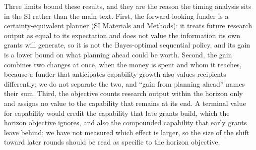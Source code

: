 Three limits bound these results, and they are the reason the timing analysis sits in the SI rather than the main text. First, the forward-looking funder is a certainty-equivalent planner (SI Materials and Methods): it treats future research output as equal to its expectation and does not value the information its own grants will generate, so it is not the Bayes-optimal sequential policy, and its gain is a lower bound on what planning ahead could be worth. Second, the gain combines two changes at once, when the money is spent and whom it reaches, because a funder that anticipates capability growth also values recipients differently; we do not separate the two, and ``gain from planning ahead'' names their sum. Third, the objective counts research output within the horizon only and assigns no value to the capability that remains at its end. A terminal value for capability would credit the capability that late grants build, which the horizon objective ignores, and also the compounded capability that early grants leave behind; we have not measured which effect is larger, so the size of the shift toward later rounds should be read as specific to the horizon objective.


